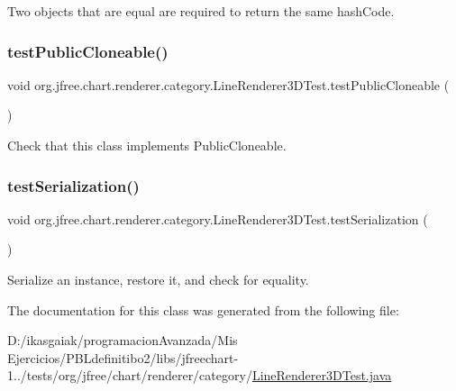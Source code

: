 Two objects that are equal are required to return the same hash\+Code. \mbox{\label{classorg_1_1jfree_1_1chart_1_1renderer_1_1category_1_1_line_renderer3_d_test_a33a4a6ac789ae893db63d1c090d783e5}} 
\subsubsection{\texorpdfstring{test\+Public\+Cloneable()}{testPublicCloneable()}}
{\footnotesize\ttfamily void org.\+jfree.\+chart.\+renderer.\+category.\+Line\+Renderer3\+D\+Test.\+test\+Public\+Cloneable (\begin{DoxyParamCaption}{ }\end{DoxyParamCaption})}

Check that this class implements Public\+Cloneable. \mbox{\label{classorg_1_1jfree_1_1chart_1_1renderer_1_1category_1_1_line_renderer3_d_test_a804fffef12308f0e1c356c72303b7b21}} 
\subsubsection{\texorpdfstring{test\+Serialization()}{testSerialization()}}
{\footnotesize\ttfamily void org.\+jfree.\+chart.\+renderer.\+category.\+Line\+Renderer3\+D\+Test.\+test\+Serialization (\begin{DoxyParamCaption}{ }\end{DoxyParamCaption})}

Serialize an instance, restore it, and check for equality. 

The documentation for this class was generated from the following file\+:\begin{DoxyCompactItemize}
\item 
D\+:/ikasgaiak/programacion\+Avanzada/\+Mis Ejercicios/\+P\+B\+Ldefinitibo2/libs/jfreechart-\/1../tests/org/jfree/chart/renderer/category/\mbox{\hyperlink{_line_renderer3_d_test_8java}{Line\+Renderer3\+D\+Test.\+java}}\end{DoxyCompactItemize}
